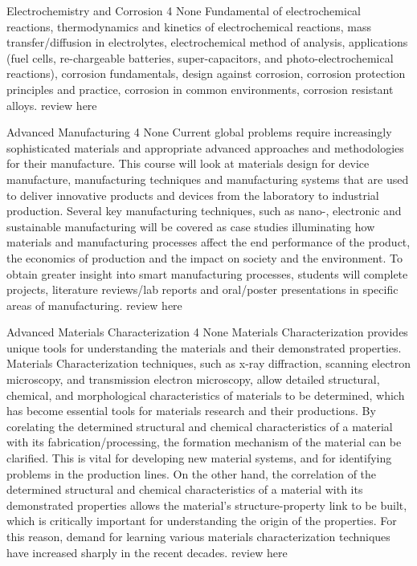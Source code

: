 	{Electrochemistry and Corrosion}
	{4}
	{None}
	{}
	{}
	{Fundamental of electrochemical reactions, thermodynamics and kinetics of electrochemical reactions, mass transfer/diffusion in electrolytes, electrochemical method of analysis, applications (fuel cells, re-chargeable batteries, super-capacitors, and photo-electrochemical reactions), corrosion fundamentals, design against corrosion, corrosion protection principles and practice, corrosion in common environments, corrosion resistant alloys.}
	{review here}

	{Advanced Manufacturing}
	{4}
	{None}
	{}
	{}
	{Current global problems require increasingly sophisticated materials and appropriate advanced approaches and methodologies for their manufacture. This course will look at materials design for device manufacture, manufacturing techniques and manufacturing systems that are used to deliver innovative products and devices from the laboratory to industrial production. Several key manufacturing techniques, such as nano-, electronic and sustainable manufacturing will be covered as case studies illuminating how materials and manufacturing processes affect the end performance of the product, the economics of production and the impact on society and the environment. To obtain greater insight into smart manufacturing processes, students will complete projects, literature reviews/lab reports and oral/poster presentations in specific areas of manufacturing.}
	{review here}

	{Advanced Materials Characterization}
	{4}
	{None}
	{}
	{}
	{Materials Characterization provides unique tools for understanding the materials and their demonstrated properties. Materials Characterization techniques, such as x-ray diffraction, scanning electron microscopy, and transmission electron microscopy, allow detailed structural, chemical, and morphological characteristics of materials to be determined, which has become essential tools for materials research and their productions. By corelating the determined structural and chemical characteristics of a material with its fabrication/processing, the formation mechanism of the material can be clarified. This is vital for developing new material systems, and for identifying problems in the production lines. On the other hand, the correlation of the determined structural and chemical characteristics of a material with its demonstrated properties allows the material's structure-property link to be built, which is critically important for understanding the origin of the properties. For this reason, demand for learning various materials characterization techniques have increased sharply in the recent decades.}
	{review here}

